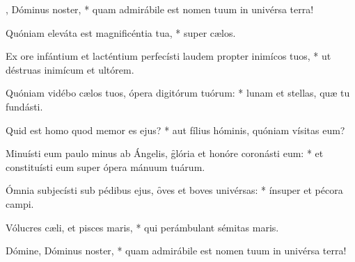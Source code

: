\begin{psalmus}
		\nopagebreak

    , Dóminus noster, * quam admirábile est nomen tuum in univérsa terra!

    Quóniam eleváta est magnificéntia tua, * super cælos.

    Ex ore infántium et lacténtium perfecísti laudem propter inimícos tuos, * ut déstruas inimícum et ultórem.

    Quóniam vidébo cælos tuos, ópera digitórum tuórum: * lunam et stellas, quæ tu fundásti.

    Quid est homo quod memor es ejus? * aut fílius hóminis, quóniam vísitas eum?

    Minuísti eum paulo minus ab Ángelis, \f glória et honóre coronásti eum: * et constituísti eum super ópera mánuum tuárum.

    Ómnia subjecísti sub pédibus ejus, \f oves et boves univérsas: * ínsuper et pécora campi.

    Vólucres cæli, et pisces maris, * qui perámbulant sémitas maris.

    Dómine, Dóminus noster, * quam admirábile est nomen tuum in univérsa terra!

\end{psalmus}
